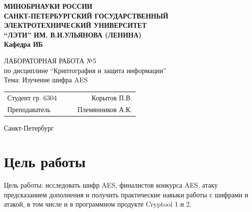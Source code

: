 \documentclass[a4paper, 14pt]{extarticle}
\begin{document}
\begin{titlepage}
    \centering
    {\bfseries
        \uppercase{
            Минобрнауки России \\
            Санкт-Петербургский государственный \\
            Электротехнический университет \\
            \enquote{ЛЭТИ} им. В.И.Ульянова (Ленина)\\
        }
        Кафедра ИБ

        \vspace{\fill}
        \uppercase{Лабораторная работа №5} \\
        по дисциплине \enquote{Криптография и защита информации} \\
        Тема: Изучение шифра AES
    }

    \vspace{\fill}
    \begin{tabularx}{0.8\textwidth}{l X c r}
        Студент гр. 6304 & & \underline{\hspace{3cm}} & Корытов П.В.\\
        Преподаватель & & \underline{\hspace{3cm}} & Племянников А.К.
    \end{tabularx}

    \vspace{1cm}
    Санкт-Петербург \\
    \the\year{}
\end{titlepage}

\newpage

\section{Цель работы}
Цель работы: исследовать шифр AES, финалистов конкурса AES, атаку предсказанием дополнения и получить практические навыки работы с шифрами и атакой, в том числе и в программном продукте Cryptool 1 и 2.
\end{document}
